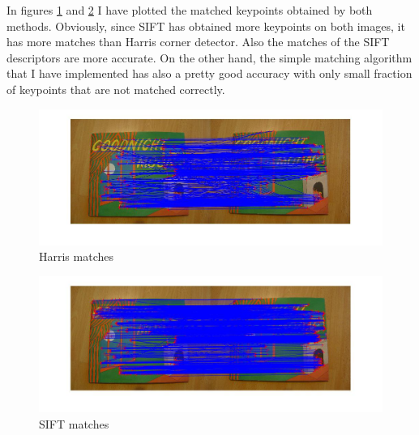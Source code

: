 \documentclass[paper=a4, fontsize=11pt]{scrartcl} %
\numberwithin{equation}{section} %
\numberwithin{figure}{section} %
\numberwithin{table}{section} %
\begin{document}
In figures \ref{fig:match_harris} and \ref{fig:match_sift} I have plotted the matched keypoints obtained by both methods. Obviously, since SIFT has obtained more keypoints on both images, it has more matches than Harris corner detector. Also the matches of the SIFT descriptors are more accurate. On the other hand, the simple matching algorithm that I have implemented has also a pretty good accuracy with only small fraction of keypoints that are not matched correctly.

\begin{figure}
  \centering
  \includegraphics[width=1\linewidth]{harris_matches.jpg}
\caption{Harris matches}
\label{fig:match_harris}
\end{figure}

\begin{figure}
  \centering
  \includegraphics[width=1\linewidth]{sift_matches.jpg}
\caption{SIFT matches}
\label{fig:match_sift}
\end{figure}
\end{document}
